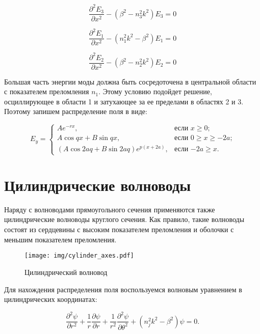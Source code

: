 \begin{equation}
	\frac{\partial^2 E_3}{\partial x^2} -(\beta^2 - n_3^2 k^2)E_3 = 0
\end{equation}

\begin{equation}
	\frac{\partial^2 E_1}{\partial x^2} -(n_1^2 k^2 - \beta^2)E_1 = 0
\end{equation}

\begin{equation}
	\frac{\partial^2 E_2}{\partial x^2} -(\beta^2 - n_2^2 k^2)E_2 = 0
\end{equation}

Большая часть энергии моды должна быть сосредоточена в центральной области с показателем преломления $n_1$. Этому условию подойдет решение, осциллирующее в области 1 и затухающее за ее пределами в областях 2 и 3. Поэтому запишем распределение поля в виде:

\begin{equation}
	E_y =
	\begin{cases}
		Ae^{-rx}, &\text{если $x \geqslant 0$;}\\
		A\cos qx + B\sin qx, &\text{если $0 \geqslant x \geqslant -2a $;}\\
		(A\cos 2aq + B\sin 2aq)e^{p(x+2a)}, &\text{если $-2a \geqslant x$.}
	\end{cases}
\end{equation}

\section{Цилиндрические волноводы}
\label{cylinder_waveguides}
Наряду с волноводами прямоугольного сечения применяются также цилиндрические волноводы круглого сечения. Как правило, такие волноводы состоят из сердцевины с высоким показателем преломления и оболочки с меньшим показателем преломления. 

\begin{figure}[h!]
	\texttt{[image: img/cylinder\_axes.pdf]}
	\caption{Цилиндрический волновод}
\end{figure}

Для нахождения распределения поля воспользуемся волновым уравнением в цилиндрических координатах:

\begin{equation}
	\frac{\partial^2\psi}{\partial r^2} + \frac{1}{r}\frac{\partial\psi}{\partial r}+\frac{1}{r^2}\frac{\partial^2\psi}{\partial\theta^2}+(n_j^2 k^2 - \beta^2)\psi = 0.
\end{equation}

